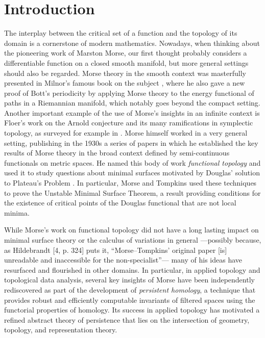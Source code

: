 
\section{Introduction}

The interplay between the critical set of a function and the topology of its domain is a cornerstone of modern mathematics.
Nowadays, when thinking about the pioneering work of Marston Morse, our first thought probably considers a differentiable function on a closed smooth manifold, but more general settings should also be regarded.
Morse theory in the smooth context was masterfully presented in Milnor's famous book on the subject \cite{Milnor.1963}, where he also gave a new proof of Bott's periodicity by applying Morse theory to the energy functional of paths in a Riemannian manifold, which notably goes beyond the compact setting.
Another important example of the use of Morse's insights in an infinite context is Floer's work on the Arnold conjecture and its many ramifications in symplectic topology, as surveyed for example in \cite{Salamon.1999}.
Morse himself worked in a very general setting, publishing in the 1930s a series of papers \cite{Morse.1937, Morse.1938, Morse.1940} in which he established the key results of Morse theory in the broad context defined by semi-continuous functionals on metric spaces.
He named this body of work \emph{functional topology} and used it to study questions about minimal surfaces motivated by Douglas' solution to Plateau’s Problem \cite{Douglas.1931}.
In particular, Morse and Tompkins \cite{Morse.1939, Morse.1941} used these techniques to prove the Unstable Minimal Surface Theorem, a result providing conditions for the existence of critical points of the Douglas functional that are not local minima.

While Morse's work on functional topology did not have a long lasting impact on minimal surface theory or the calculus of variations in general ---possibly because, as Hildebrandt [4, p. 324] puts it, ``Morse--Tompkins' original paper [is] unreadable and inaccessible for the non-specialist''---
many of his ideas have resurfaced and flourished in other domains.
In particular, in applied topology and topological data analysis, several key insights of Morse have been independently rediscovered as part of the development of \emph{persistent homology}, a technique that provides robust and efficiently computable invariants of filtered spaces using the functorial properties of homology.
Its success in applied topology has motivated a refined abstract theory of persistence that lies on the intersection of geometry, topology, and representation theory.

